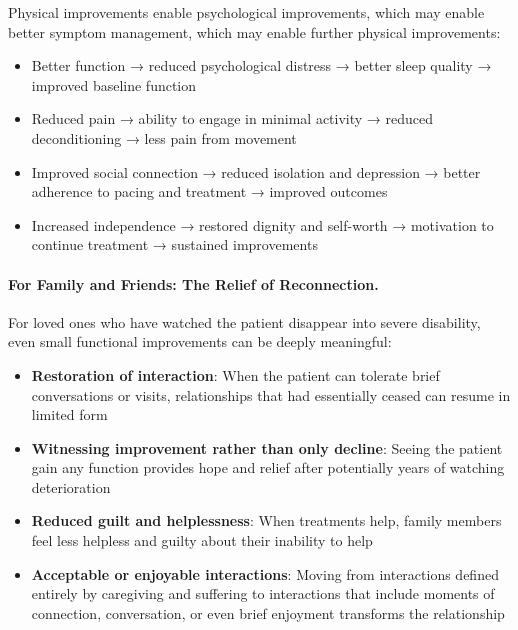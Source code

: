 Physical improvements enable psychological improvements, which may enable better symptom management, which may enable further physical improvements:

\begin{itemize}
    \item Better function → reduced psychological distress → better sleep quality → improved baseline function
    \item Reduced pain → ability to engage in minimal activity → reduced deconditioning → less pain from movement
    \item Improved social connection → reduced isolation and depression → better adherence to pacing and treatment → improved outcomes
    \item Increased independence → restored dignity and self-worth → motivation to continue treatment → sustained improvements
\end{itemize}

\paragraph{For Family and Friends: The Relief of Reconnection.}

For loved ones who have watched the patient disappear into severe disability, even small functional improvements can be deeply meaningful:

\begin{itemize}
    \item \textbf{Restoration of interaction}: When the patient can tolerate brief conversations or visits, relationships that had essentially ceased can resume in limited form

    \item \textbf{Witnessing improvement rather than only decline}: Seeing the patient gain any function provides hope and relief after potentially years of watching deterioration

    \item \textbf{Reduced guilt and helplessness}: When treatments help, family members feel less helpless and guilty about their inability to help

    \item \textbf{Acceptable or enjoyable interactions}: Moving from interactions defined entirely by caregiving and suffering to interactions that include moments of connection, conversation, or even brief enjoyment transforms the relationship
\end{itemize}

